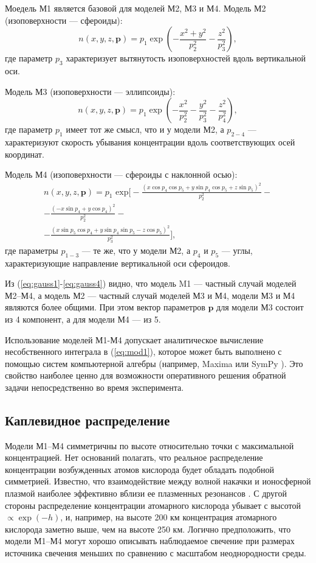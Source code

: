 \documentclass[12pt,a4paper]{article}
\renewcommand{\vec}{\mathbf}
\begin{document}
Моедель М1 является базовой для моделей М2, М3 и М4. Модель М2 (изоповерхности --- сфероиды):
\begin{equation}\label{eq:gauss2}
	n(x,y,z,\vec{p})=p_1 \exp{(-\frac{x^2+y^2}{p_2^2}-\frac{z^2}{p_3^2})},
\end{equation}
где параметр $p_3$ характеризует вытянутость изоповерхностей вдоль вертикальной оси.

Модель М3 (изоповерхности --- эллипсоиды):
\begin{equation}\label{eq:gauss3}
n(x,y,z,\vec{p})=p_1 \exp{(-\frac{x^2}{p_2^2}-\frac{y^2}{p_3^2}-\frac{z^2}{p_4^2})},
\end{equation}
где параметр $p_{1}$ имеет тот же смысл, что и у модели М2, а $p_{2-4}$ --- 
характеризуют скорость убывания концентрации вдоль соответствующих осей координат.

Модель М4 (изоповерхности --- сфероиды с наклонной осью):
\begin{equation}\label{eq:gauss4}
\begin{split}
n(x,y,z,\vec{p})=p_1 \text{ exp} \bigg[ 
-\frac{(x\cos{p_4}\cos{p_5} + y\sin{p_4}\cos{p_5} + z\sin{p_5})^2}{p_2^2}-\\
-\frac{(-x\sin{p_4} + y\cos{p_4})^2}{p_2^2} -\\ 
-\frac{(x\sin{p_5}\cos{p_4} + y\sin{p_4}\sin{p_5} - z\cos{p_5})^2}{p_3^2}\bigg],
\end{split}
\end{equation}
где параметры $p_{1-3}$ --- те же, что у модели М2, а $p_4$ и $p_5$ --- углы, характеризующие направление вертикальной оси сфероидов.

Из (\ref{eq:gauss1}-\ref{eq:gauss4}) видно, что модель M1 --- частный случай моделей М2--М4, а модель М2 --- частный случай моделей М3 и М4, модели М3 и М4 являются более общими. При этом вектор параметров $\vec{p}$ для модели М3 состоит из 4 компонент, а для модели М4 --- из 5.

Использование моделей М1-М4 допускает аналитическое вычисление несобственного интеграла в (\ref{eq:mod1}), которое может быть выполнено с помощью систем компьютерной алгебры (например, Maxima \cite{Maxima} или SymPy \cite{SymPy}). Это свойство наиболее ценно для возможности оперативного решения обратной задачи непосредственно во время эксперимента. 

\subsection{Каплевидное распределение} \label{subsec:model2}
Модели М1--М4 симметричны по высоте относительно точки с максимальной концентрацией. Нет оснований полагать, что реальное распределение концентрации возбужденных атомов кислорода будет обладать подобной симметрией. Известно, что взаимодействие между волной накачки и ионосферной плазмой наиболее эффективно вблизи ее плазменных резонансов \cite{Trach1979}. С другой стороны распределение концентрации атомарного кислорода убывает с высотой $\propto \exp {(-h)}$, и, например, на высоте 200 км концентрация атомарного кислорода заметно выше, чем на высоте 250 км. Логично предположить, что модели М1--М4 могут хорошо описывать наблюдаемое свечение при размерах источника свечения меньших по сравнению с масштабом неоднородности среды. 
\end{document}
